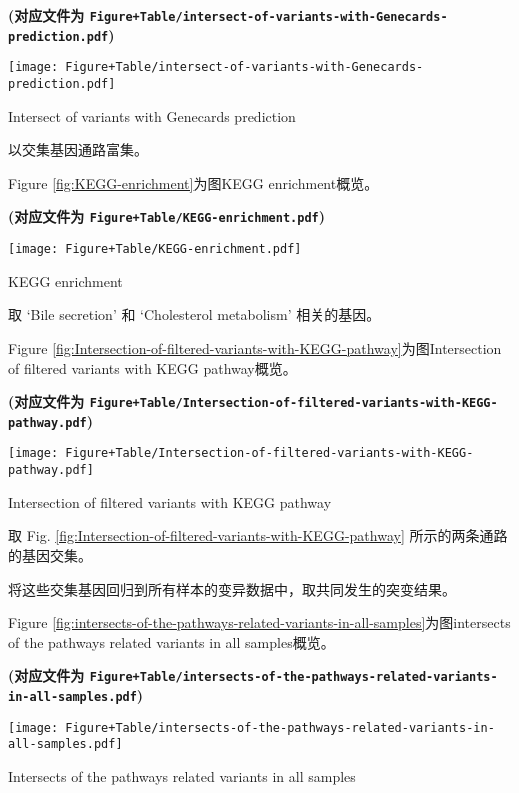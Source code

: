 \documentclass[
]{article}
\begin{document}
\textbf{(对应文件为 \texttt{Figure+Table/intersect-of-variants-with-Genecards-prediction.pdf})}

\def\@captype{figure}
\begin{center}
\texttt{[image: Figure+Table/intersect-of-variants-with-Genecards-prediction.pdf]}
\caption{Intersect of variants with Genecards prediction}\label{fig:intersect-of-variants-with-Genecards-prediction}
\end{center}

以交集基因通路富集。

Figure \ref{fig:KEGG-enrichment}为图KEGG enrichment概览。

\textbf{(对应文件为 \texttt{Figure+Table/KEGG-enrichment.pdf})}

\def\@captype{figure}
\begin{center}
\texttt{[image: Figure+Table/KEGG-enrichment.pdf]}
\caption{KEGG enrichment}\label{fig:KEGG-enrichment}
\end{center}

取 `Bile secretion' 和 `Cholesterol metabolism' 相关的基因。

Figure \ref{fig:Intersection-of-filtered-variants-with-KEGG-pathway}为图Intersection of filtered variants with KEGG pathway概览。

\textbf{(对应文件为 \texttt{Figure+Table/Intersection-of-filtered-variants-with-KEGG-pathway.pdf})}

\def\@captype{figure}
\begin{center}
\texttt{[image: Figure+Table/Intersection-of-filtered-variants-with-KEGG-pathway.pdf]}
\caption{Intersection of filtered variants with KEGG pathway}\label{fig:Intersection-of-filtered-variants-with-KEGG-pathway}
\end{center}

取 Fig. \ref{fig:Intersection-of-filtered-variants-with-KEGG-pathway} 所示的两条通路的基因交集。

将这些交集基因回归到所有样本的变异数据中，取共同发生的突变结果。

Figure \ref{fig:intersects-of-the-pathways-related-variants-in-all-samples}为图intersects of the pathways related variants in all samples概览。

\textbf{(对应文件为 \texttt{Figure+Table/intersects-of-the-pathways-related-variants-in-all-samples.pdf})}

\def\@captype{figure}
\begin{center}
\texttt{[image: Figure+Table/intersects-of-the-pathways-related-variants-in-all-samples.pdf]}
\caption{Intersects of the pathways related variants in all samples}\label{fig:intersects-of-the-pathways-related-variants-in-all-samples}
\end{center}
\end{document}
